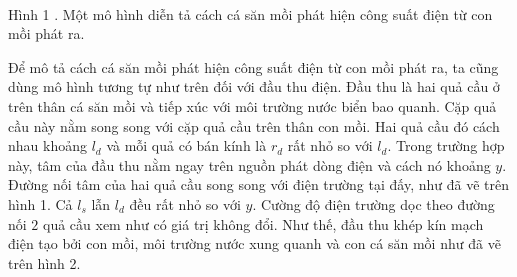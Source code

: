 \begin{vd}
\begin{center}
\\
    Hình 1 . Một mô hình diễn tả cách cá săn mồi phát hiện công suất điện từ con mồi phát ra.
\end{center}
Để mô tả cách cá săn mồi phát hiện công suất điện từ con mồi phát ra, ta cũng dùng mô hình tương tự như trên đối với đầu thu điện. Đầu thu là hai quả cầu ở trên thân cá săn mồi và tiếp xúc với môi trường nước biển bao quanh. Cặp quả cầu này nằm song song với cặp quả cầu trên thân con mồi. Hai quả cầu đó cách  nhau khoảng $l_d$ và mỗi quả có bán kính là $r_d$ rất nhỏ so với $l_d$. Trong trường hợp này, tâm của đầu thu nằm ngay trên nguồn phát dòng điện và cách nó khoảng $y$. Đường nối tâm của hai quả cầu song song với điện trường tại đấy, như đã vẽ trên hình 1. Cả $l_s$ lẫn $l_d$ đều rất nhỏ so với $y$. Cường độ điện trường dọc theo đường nối $2$ quả cầu xem như có giá trị không đổi. Như thế, đầu thu khép kín mạch điện tạo bởi con mồi, môi trường nước xung quanh và con cá săn mồi như đã vẽ trên hình 2.
\begin{center}

\begin{tikzpicture}[x=0.75pt,y=0.75pt,yscale=-1,xscale=1]


\end{tikzpicture}
\end{center}
\end{vd}
